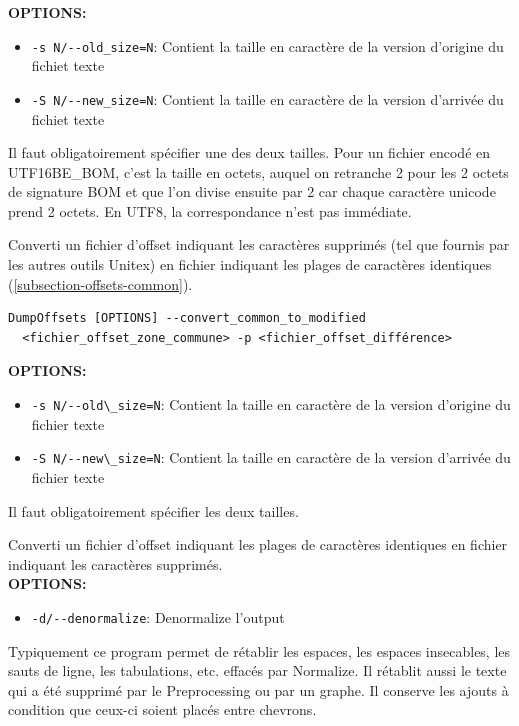 \noindent \textbf{OPTIONS:}
\begin{itemize}
\item \verb+-s N/--old_size=N+: Contient la taille en caractère de la version d'origine du fichiet texte
\item \verb+-S N/--new_size=N+: Contient la taille en caractère de la version d'arrivée du fichiet texte
\end{itemize}
Il faut obligatoirement spécifier une des deux tailles. Pour un fichier encodé en UTF16BE\_BOM, c’est la taille en
octets, auquel on retranche 2 pour les 2 octets de signature BOM et que l’on divise ensuite par 2 car chaque
caractère unicode prend 2 octets. En UTF8, la correspondance n’est pas immédiate.

Converti un fichier d'offset indiquant les caractères supprimés (tel que fournis par les autres outils Unitex) en fichier
indiquant les plages de caractères identiques (\ref{subsection-offsets-common}).

\bigskip
\begin{verbatim}
DumpOffsets [OPTIONS] --convert_common_to_modified
  <fichier_offset_zone_commune> -p <fichier_offset_différence>
\end{verbatim}
\bigskip

\noindent \textbf{OPTIONS:}
\begin{itemize}
\item \verb+-s N/--old\_size=N+: Contient la taille en caractère de la version d'origine du fichier texte
\item \verb+-S N/--new\_size=N+: Contient la taille en caractère de la version d'arrivée du fichier texte
\end{itemize}
Il faut obligatoirement spécifier les deux tailles.

Converti un fichier d'offset indiquant les plages de caractères identiques en fichier indiquant les caractères supprimés.
\\
\newline
\noindent \textbf{OPTIONS:}
\begin{itemize}
\item \verb+-d/--denormalize+: Denormalize l'output
\end{itemize}
Typiquement ce program permet de rétablir les espaces, les espaces insecables, les sauts de ligne, les tabulations, etc. effacés par Normalize.
Il rétablit aussi le texte qui a été supprimé par le Preprocessing ou par un graphe. Il conserve les ajouts à condition que ceux-ci soient placés entre chevrons.

